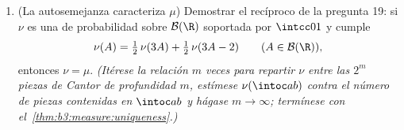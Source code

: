 \begin{problem}
\begin{enumerate}[resume]
{        de cada pieza. El exponente $s$ es la dimensión  de $C$, como dirán
        cursos posteriores.)} \item (La autosemejanza caracteriza $\mu$)
        Demostrar el recíproco de la pregunta 19: si $\nu$ es una
         de probabilidad sobre
        $\mathcal B(\R)$ soportada por $\intcc01$ y cumple
        \[
        \nu(A) = \tfrac12\,\nu(3A) + \tfrac12\,\nu(3A - 2)
        \qquad (A \in \mathcal B(\R)),
        \]
        entonces $\nu = \mu$. \emph{(Itérese la relación $m$ veces para
        repartir $\nu$ entre las $2^m$ piezas de Cantor de profundidad
        $m$, estímese $\nu(\intoc ab)$ contra el número de piezas
        contenidas en $\intoc ab$ y hágase $m \to \infty$; termínese con
        el~\cref{thm:b3:measure:uniqueness}.)}
\end{enumerate}
\end{problem}

